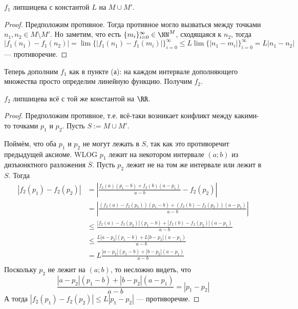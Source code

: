 \documentclass[12pt,a4paper]{article}
\begin{document}
\begin{enumproblem}[\textcolor{green}{сдано}]
\begin{enumerate}
            \begin{lemma}
                $f_1$ липшицева с константой $L$ на $M \cup M'$.
            \end{lemma}

            \begin{proof}
                Предположим противное. Тогда противное могло вызваться между точками $n_1, n_2 \in M \setminus M'$. Но заметим, что есть $\{m_i\}_{i=0}^\infty \in \NN^M$, сходящаяся к $n_2$, тогда $|f_1(n_1) - f_1(n_2)| = \lim \{|f_1(n_1)-f_1(m_i)|\}_{i=0}^\infty \leqslant L\lim \{|n_1-m_i|\}_{i=0}^\infty = L |n_1-n_2|$ --- противоречие.
            \end{proof}

            Теперь дополним $f_1$ как в пункте (а): на каждом интервале дополняющего множества просто определим линейную функцию. Получим $f_2$.

            \begin{lemma}
                $f_2$ липшицева всё с той же константой на $\RR$.
            \end{lemma}

            \begin{proof}
                Предположим противное, т.е. всё-таки возникает конфликт между какими-то точками $p_1$ и $p_2$. Пусть $S := M \cup M'$.

                Поймём, что оба $p_1$ и $p_2$ не могут лежать в $S$, так как это противоречит предыдущей аксиоме. WLOG $p_1$ лежит на некотором интервале $(a;b)$ из дизъюнктного разложения $\overline{S}$. Пусть $p_2$ лежит не на том же интервале или лежит в $S$. Тогда
                \begin{align*}
                    |f_2(p_1) - f_2(p_2)|
                    &= \left|\frac{f_2(a)(p_1-b) + f_2(b)(a-p_1)}{a-b} - f_2(p_2)\right|\\
                    &= \left|\frac{(f_2(a) - f_2(p_2))(p_1-b) + (f_2(b) - f_2(p_2))(a-p_1)}{a-b}\right|\\
                    &\leqslant \frac{|f_2(a) - f_2(p_2)|(p_1-b) + |f_2(b) - f_2(p_2)|(a-p_1)}{a-b}\\
                    &\leqslant \frac{L|a-p_2|(p_1-b) + L|b-p_2|(a-p_1)}{a-b}\\
                    &= L\frac{|a-p_2|(p_1-b) + |b-p_2|(a-p_1)}{a-b}\\
                \end{align*}
                Поскольку $p_2$ не лежит на $(a;b)$, то несложно видеть, что
                \[\frac{|a-p_2|(p_1-b) + |b-p_2|(a-p_1)}{a-b} = |p_1-p_2|\]
                А тогда $|f_2(p_1) - f_2(p_2)| \leqslant L |p_1-p_2|$ --- противоречие.


\end{proof}
\end{enumerate}
\end{enumproblem}
\end{document}
